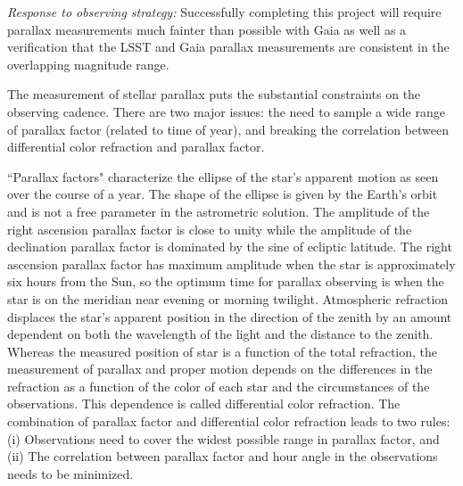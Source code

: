 {\it Response to observing strategy:} Successfully completing this project will require parallax measurements much fainter than possible with Gaia as well as a verification that the LSST and Gaia parallax measurements are consistent in the overlapping magnitude range.

The measurement of stellar parallax puts the substantial constraints on the observing cadence. There are two major issues: the need to sample a wide range of parallax factor (related to time of year), and breaking the correlation between differential color refraction and parallax factor.

``Parallax factors" characterize the ellipse of the star's apparent motion as seen over the course of a year. The shape of the ellipse is given by the Earth's orbit and is not a free parameter in the astrometric solution. The amplitude of the right ascension parallax factor is close to unity while the amplitude of the declination parallax factor is dominated by the sine of ecliptic latitude.
The right ascension parallax factor has maximum amplitude when the star is approximately six hours from the Sun, so the optimum time for parallax observing is when the
star is on the meridian near evening or morning twilight. Atmospheric refraction displaces the star's apparent position in the direction of the zenith by an amount dependent on both the wavelength of the light and the distance to the zenith. Whereas the measured position of star is a function of the total refraction, the measurement of parallax
and proper motion depends on the differences in the refraction as a function of the color of each star and the circumstances of the observations.  This
dependence is called differential color refraction. The combination of parallax factor and differential color refraction leads to two rules: (i) Observations need to cover the widest possible range in parallax
factor, and (ii) The correlation between parallax factor and hour angle in the observations needs to be minimized.




